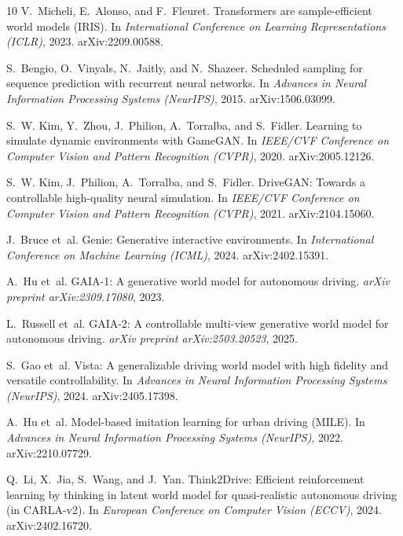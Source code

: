 \documentclass[11pt]{article}
\begin{document}
\begin{thebibliography}{10}
V.~Micheli, E.~Alonso, and F.~Fleuret.
\newblock Transformers are sample-efficient world models (IRIS).
\newblock In \emph{International Conference on Learning Representations (ICLR)}, 2023. arXiv:2209.00588.

S.~Bengio, O.~Vinyals, N.~Jaitly, and N.~Shazeer.
\newblock Scheduled sampling for sequence prediction with recurrent neural networks.
\newblock In \emph{Advances in Neural Information Processing Systems (NeurIPS)}, 2015. arXiv:1506.03099.

S.~W. Kim, Y.~Zhou, J.~Philion, A.~Torralba, and S.~Fidler.
\newblock Learning to simulate dynamic environments with GameGAN.
\newblock In \emph{IEEE/CVF Conference on Computer Vision and Pattern Recognition (CVPR)}, 2020. arXiv:2005.12126.

S.~W. Kim, J.~Philion, A.~Torralba, and S.~Fidler.
\newblock DriveGAN: Towards a controllable high-quality neural simulation.
\newblock In \emph{IEEE/CVF Conference on Computer Vision and Pattern Recognition (CVPR)}, 2021. arXiv:2104.15060.

J.~Bruce et~al.
\newblock Genie: Generative interactive environments.
\newblock In \emph{International Conference on Machine Learning (ICML)}, 2024. arXiv:2402.15391.

A.~Hu et~al.
\newblock GAIA-1: A generative world model for autonomous driving.
\newblock \emph{arXiv preprint arXiv:2309.17080}, 2023.

L.~Russell et~al.
\newblock GAIA-2: A controllable multi-view generative world model for autonomous driving.
\newblock \emph{arXiv preprint arXiv:2503.20523}, 2025.

S.~Gao et~al.
\newblock Vista: A generalizable driving world model with high fidelity and versatile controllability.
\newblock In \emph{Advances in Neural Information Processing Systems (NeurIPS)}, 2024. arXiv:2405.17398.

A.~Hu et~al.
\newblock Model-based imitation learning for urban driving (MILE).
\newblock In \emph{Advances in Neural Information Processing Systems (NeurIPS)}, 2022. arXiv:2210.07729.

Q.~Li, X.~Jia, S.~Wang, and J.~Yan.
\newblock Think2Drive: Efficient reinforcement learning by thinking in latent world model for quasi-realistic autonomous driving (in CARLA-v2).
\newblock In \emph{European Conference on Computer Vision (ECCV)}, 2024. arXiv:2402.16720.


\end{thebibliography}
\end{document}
